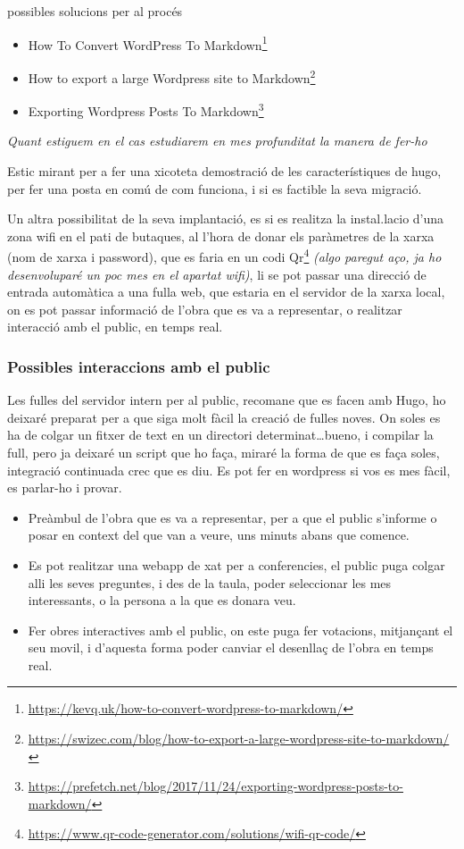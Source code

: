 \documentclass[
  10pt, krantz2,
]{krantz}
\DeclareRobustCommand{\href}[2]{#2\footnote{\url{#1}}}
\providecommand{\tightlist}{%
  \setlength{\itemsep}{0pt}\setlength{\parskip}{0pt}}
\renewcommand{\href}[2]{#2\footnote{\url{#1}}}
\begin{document}
possibles solucions per al procés

\begin{itemize}
\tightlist
\item
  \href{https://kevq.uk/how-to-convert-wordpress-to-markdown/}{How To Convert WordPress To Markdown}
\item
  \href{https://swizec.com/blog/how-to-export-a-large-wordpress-site-to-markdown/}{How to export a large Wordpress site to Markdown}
\item
  \href{https://prefetch.net/blog/2017/11/24/exporting-wordpress-posts-to-markdown/}{Exporting Wordpress Posts To Markdown}
\end{itemize}

\emph{Quant estiguem en el cas estudiarem en mes profunditat la manera de fer-ho}

Estic mirant per a fer una xicoteta demostració de les característiques de hugo, per fer una posta en comú de com funciona, i si es factible la seva migració.

Un altra possibilitat de la seva implantació, es si es realitza la instal.lacio d'una zona wifi en el pati de butaques, al l'hora de donar els paràmetres de la xarxa (nom de xarxa i password), que es faria en un codi \href{https://www.qr-code-generator.com/solutions/wifi-qr-code/}{Qr} \emph{(algo paregut aço, ja ho desenvoluparé un poc mes en el apartat wifi)}, li se pot passar una direcció de entrada automàtica a una fulla web, que estaria en el servidor de la xarxa local, on es pot passar informació de l'obra que es va a representar, o realitzar interacció amb el public, en temps real.

\hypertarget{possibles-interaccions-amb-el-public}{%
\subsubsection{Possibles interaccions amb el public}\label{possibles-interaccions-amb-el-public}}

Les fulles del servidor intern per al public, recomane que es facen amb Hugo, ho deixaré preparat per a que siga molt fàcil la creació de fulles noves. On soles es ha de colgar un fitxer de text en un directori determinat\ldots bueno, i compilar la full, pero ja deixaré un script que ho faça, miraré la forma de que es faça soles, integració continuada crec que es diu. Es pot fer en wordpress si vos es mes fàcil, es parlar-ho i provar.

\begin{itemize}
\item
  Preàmbul de l'obra que es va a representar, per a que el public s'informe o posar en context del que van a veure, uns minuts abans que comence.
\item
  Es pot realitzar una webapp de xat per a conferencies, el public puga colgar alli les seves preguntes, i des de la taula, poder seleccionar les mes interessants, o la persona a la que es donara veu.
\item
  Fer obres interactives amb el public, on este puga fer votacions, mitjançant el seu movil, i d'aquesta forma poder canviar el desenllaç de l'obra en temps real.
\end{itemize}
\end{document}
